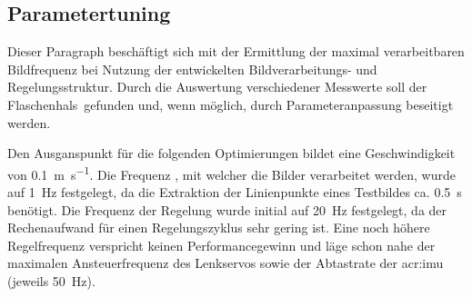 \subsection{Parametertuning \dcsecondauthorshort}
Dieser Paragraph beschäftigt sich mit der Ermittlung der maximal verarbeitbaren Bildfrequenz bei Nutzung der entwickelten Bildverarbeitungs- und Regelungsstruktur. Durch die Auswertung verschiedener Messwerte soll der \glqq Flaschenhals\grqq\ gefunden und, wenn möglich, durch Parameteranpassung beseitigt werden.


Den Ausganspunkt für die folgenden Optimierungen bildet eine Geschwindigkeit von
\SI{0.1}{\metre\per\second}. Die Frequenz , mit welcher die Bilder verarbeitet werden, wurde auf \SI{1}{\hertz} festgelegt, da die Extraktion der Linienpunkte eines Testbildes ca. \SI{0.5}{\second} benötigt. Die Frequenz der Regelung  wurde initial auf \SI{20}{\hertz} festgelegt, da der Rechenaufwand für einen Regelungszyklus sehr gering ist. Eine noch höhere Regelfrequenz verspricht keinen Performancegewinn und läge schon nahe der maximalen Ansteuerfrequenz des Lenkservos sowie der Abtastrate der \gls{acr:imu} (jeweils \SI{50}{\hertz}).

